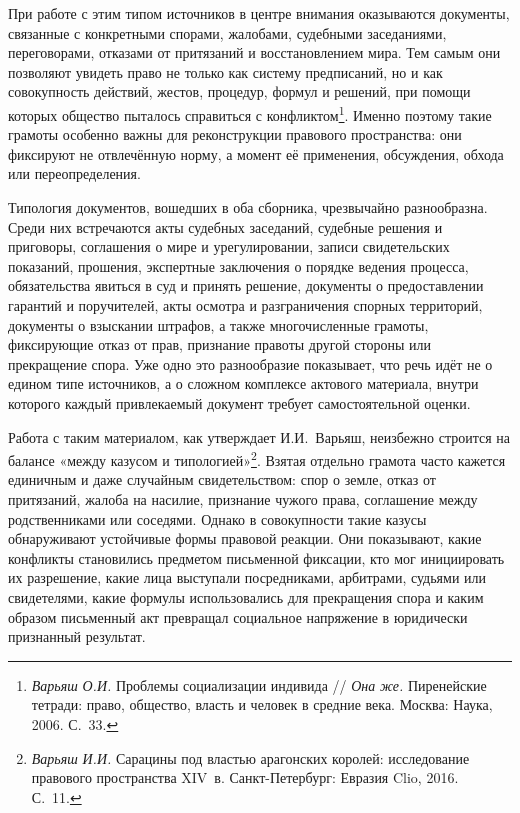 При работе с этим типом источников в центре внимания оказываются документы, связанные с конкретными спорами, жалобами, судебными заседаниями, переговорами, отказами от притязаний и восстановлением мира. Тем самым они позволяют увидеть право не только как систему предписаний, но и как совокупность действий, жестов, процедур, формул и решений, при помощи которых общество пыталось справиться с конфликтом\footnote{\emph{Варьяш}\emph{ }\emph{О}\emph{.}\emph{И}\emph{.} Проблемы социализации индивида // \emph{Она}\emph{ }\emph{же}\emph{.} Пиренейские тетради: право, общество, власть и человек в средние века. Москва: Наука, 2006. С.~33.}. Именно поэтому такие грамоты особенно важны для реконструкции правового пространства: они фиксируют не отвлечённую норму, а момент её применения, обсуждения, обхода или переопределения.

Типология документов, вошедших в оба сборника, чрезвычайно разнообразна. Среди них встречаются акты судебных заседаний, судебные решения и приговоры, соглашения о мире и урегулировании, записи свидетельских показаний, прошения, экспертные заключения о порядке ведения процесса, обязательства явиться в суд и принять решение, документы о предоставлении гарантий и поручителей, акты осмотра и разграничения спорных территорий, документы о взыскании штрафов, а также многочисленные грамоты, фиксирующие отказ от прав, признание правоты другой стороны или прекращение спора. Уже одно это разнообразие показывает, что речь идёт не о едином типе источников, а о сложном комплексе актового материала, внутри которого каждый привлекаемый документ требует самостоятельной оценки.

Работа с таким материалом, как утверждает И.И.~Варьяш, неизбежно строится на балансе «между казусом и типологией»\footnote{\emph{Варьяш}\emph{ И.И.} Сарацины под властью арагонских королей: исследование правового пространства XIV~в. Санкт-Петербург: Евразия Clio, 2016. С.~11.}. Взятая отдельно грамота часто кажется единичным и даже случайным свидетельством: спор о земле, отказ от притязаний, жалоба на насилие, признание чужого права, соглашение между родственниками или соседями. Однако в совокупности такие казусы обнаруживают устойчивые формы правовой реакции. Они показывают, какие конфликты становились предметом письменной фиксации, кто мог инициировать их разрешение, какие лица выступали посредниками, арбитрами, судьями или свидетелями, какие формулы использовались для прекращения спора и каким образом письменный акт превращал социальное напряжение в юридически признанный результат.

